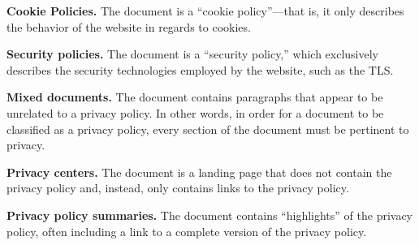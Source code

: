 \textbf{Cookie Policies.} The document is a ``cookie policy''---that is, it only describes the behavior of the website in regards to cookies. 
\iffalse
Cookie policies are typically subsets of a privacy policy; however, we define a ``cookie policy'' as a document that \textit{only} describes cookies. 
\fi

\textbf{Security policies.} The document is a ``security policy,'' which exclusively describes the security technologies employed by the website, such as the TLS.
\iffalse
These documents do not contain mentions of practices related to privacy.
\fi

\textbf{Mixed documents.} The document contains paragraphs that appear to be unrelated to a privacy policy. In other words, in order for a document to be classified as a privacy policy, every section of the document must be pertinent to privacy. 
\iffalse
This is, once again, a decision to reduce the number of false positives in our classification. Examples from our sample include mentions of the website's policy about copyrighted material.
\fi

\textbf{Privacy centers.} The document is a landing page that does not contain the privacy policy and, instead, only contains links to the privacy policy.

\textbf{Privacy policy summaries.} The document contains ``highlights'' of the privacy policy, often including a link to a complete version of the privacy policy.

